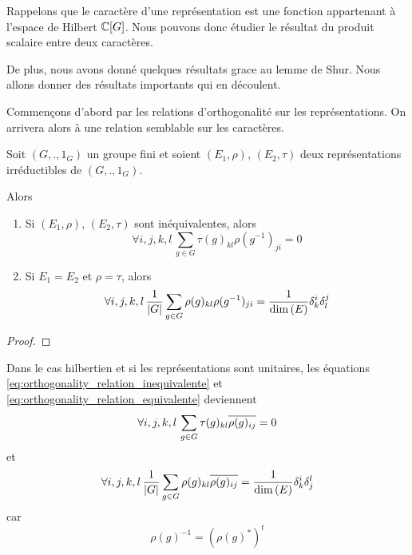 Rappelons que le caractère d'une représentation est une fonction appartenant à
l'espace de Hilbert $\mathbb{C}[G]$. Nous pouvons donc étudier le résultat du
produit scalaire entre deux caractères.

De plus, nous avons donné quelques résultats grace au lemme de Shur. Nous allons
donner des résultats importants qui en découlent.

Commençons d'abord par les relations d'orthogonalité sur les représentations. On
arrivera alors à une relation semblable sur les caractères.

\begin{proposition}
	Soit $(G, ., 1_{G})$ un groupe fini et soient $(E_{1}, \rho)$,
	$(E_{2}, \tau)$
	deux représentations irréductibles de $(G, ., 1_{G})$.

	Alors
	\begin{enumerate}
		\item Si $(E_{1}, \rho)$,
			$(E_{2}, \tau)$ sont
			inéquivalentes, alors
			\begin{equation}
				\label{eq:orthogonality_relation_inequivalente}
				\forall i, j, k, l \, \sum_{g \in G} \tau(g)_{kl}
				\rho(g^{-1})_{ji}
				= 0
			\end{equation}
		\item Si $E_{1} = E_{2}$ et $\rho = \tau$, alors
		\begin{equation}
			\label{eq:orthogonality_relation_equivalente}
			\forall i, j, k, l \, \frac{1}{|G|} \sum_{g \in G}
			\rho(g)_{kl} \rho(g^{-1})_{ji}
			= \frac{1}{\dim{(E)}} \delta_{k}^{i} \delta_{l}^{j}
		\end{equation}
	\end{enumerate}
\end{proposition}

\ifdefined\outputproof
\begin{proof}

\end{proof}
\fi

\begin{remarque}
	Dans le cas hilbertien et si les représentations sont unitaires, les équations
	\ref{eq:orthogonality_relation_inequivalente} et
	\ref{eq:orthogonality_relation_equivalente} deviennent
	\begin{equation}
		\forall i, j, k, l \, \sum_{g \in G} \tau(g)_{kl}
		\overline{\rho(g)_{ij}}
		= 0
	\end{equation}
	et
	\begin{equation}
		\forall i, j, k, l \, \frac{1}{|G|} \sum_{g \in G}
		\rho(g)_{kl} \overline{\rho(g)_{ij}}
		= \frac{1}{\dim{(E)}} \delta_{k}^{i} \delta_{j}^{l}
	\end{equation}
	car
	\begin{equation}
		\rho(g)^{-1} = {(\rho(g)^{*})}^{t}
	\end{equation}
\end{remarque}

